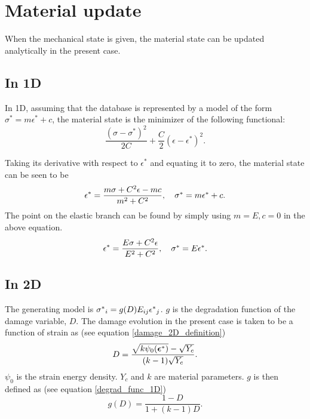 \documentclass[10pt]{cas-sc}
\begin{document}
\section{Material update\label{app_mat_update}}
When the mechanical state is given, the material state can be updated analytically in the present case. 
\subsection*{In 1D}
In 1D, assuming that the database is represented by a model of the form $\sigma^* = m \epsilon ^*+c$, the material state is the minimizer of the following functional:
\begin{equation}
	\frac{(\sigma - \sigma^*)^2}{2C} + \frac{C}{2}(\epsilon - \epsilon^*)^2.	 
\end{equation}

Taking its derivative with respect to $\epsilon^*$ and equating it to zero, the material state can be seen to be
\begin{equation}
	\epsilon^* = \frac{m \sigma + C^2 \epsilon -mc}{m^2 + C^2}, \quad \mbox{$\sigma^*$} = m \mbox{$\epsilon^*$}+c. \label{damage_branch_material_state}
\end{equation}
The point on the elastic branch can be found by simply using $m=E, c=0$ in the above equation.
\begin{equation}
	\epsilon^* = \frac{E \sigma + C^2 \epsilon}{E^2 + C^2}, \quad \mbox{$\sigma^*$} = E \mbox{$\epsilon^*$}. \label{elastic_branch_material_state}
\end{equation}

\subsection*{In 2D}
The generating model is $\mbox{$\sigma^*$}_i = g(D) E_{ij} \mbox{$\epsilon^*$}_j$. $g$ is the degradation function of the damage variable, $D$. The damage evolution in the present case is taken to be a function of strain as (see equation \ref{damage_2D_definition})
\begin{equation*}
	D = \frac{\sqrt{k \psi_0(\mbox{\boldmath $\epsilon$}^*)} - \sqrt{Y_c}}{(k-1)\sqrt{Y_c}}.
\end{equation*}
$\psi_0$ is the strain energy density. $Y_c$ and $k$ are material parameters. $g$ is then defined as (see equation \ref{degrad_func_1D})
\begin{equation*}
	g(D) = \frac{1-D}{1+(k-1)D}.
\end{equation*}
\end{document}

